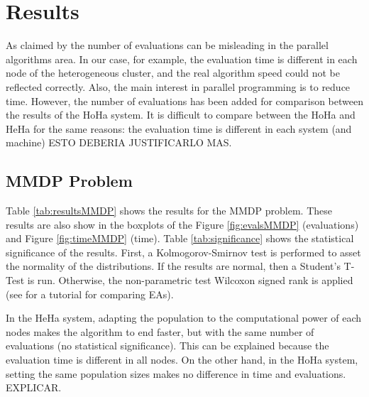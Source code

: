 \documentclass{sig-alternate}
\begin{document}
\section{Results}
\label{sec:results}

As claimed by \cite{EVALUATIONPARALLEL} the number of evaluations can be misleading in the parallel algorithms area. In our case, for example, the evaluation time is different in each node of the heterogeneous cluster, and the real algorithm speed could not be reflected correctly. Also, the main interest in parallel programming is to reduce time. However, the number of evaluations has been added for comparison between the results of the HoHa system. It is difficult to compare between the HoHa and HeHa for the same reasons: the evaluation time is different in each system (and machine) ESTO DEBERIA JUSTIFICARLO MAS.

\subsection{MMDP Problem}

Table \ref{tab:resultsMMDP} shows the results for the MMDP problem. These results are also show in the boxplots of the Figure \ref{fig:evalsMMDP} (evaluations) and Figure \ref{fig:timeMMDP} (time). Table \ref{tab:significance} shows the statistical significance of the results. First, a Kolmogorov-Smirnov test is performed to asset the normality of the distributions. If the results are normal, then a Student's T-Test is run. Otherwise, the non-parametric test Wilcoxon signed rank is applied (see \cite{TUTORIAL} for a tutorial for comparing EAs).

 In the HeHa system, adapting the population to the computational power of each nodes makes the algorithm to end faster, but with the same number of evaluations (no statistical significance). This can be explained because the evaluation time is different in all nodes. On the other hand, in the HoHa system, setting the same population sizes makes no difference in time and evaluations. EXPLICAR.
\end{document}
